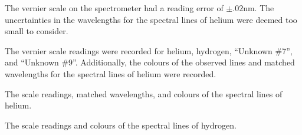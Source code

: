 \begin{paper}
The vernier scale on the spectrometer had a reading error of
$\pm.02\si{\nano\meter}$.
The uncertainties in the wavelengths for the spectral lines of helium were
deemed too small to consider.

The vernier scale readings were recorded for helium, hydrogen, ``Unknown \#7'',
and ``Unknown \#9''.
Additionally, the colours of the observed lines and matched wavelengths for the
spectral lines of helium were recorded.

{The scale readings, matched wavelengths, and colours of the spectral lines of helium.}\vspace{1em}

{The scale readings and colours of the spectral lines of hydrogen.}\vspace{1em}


\end{paper}
